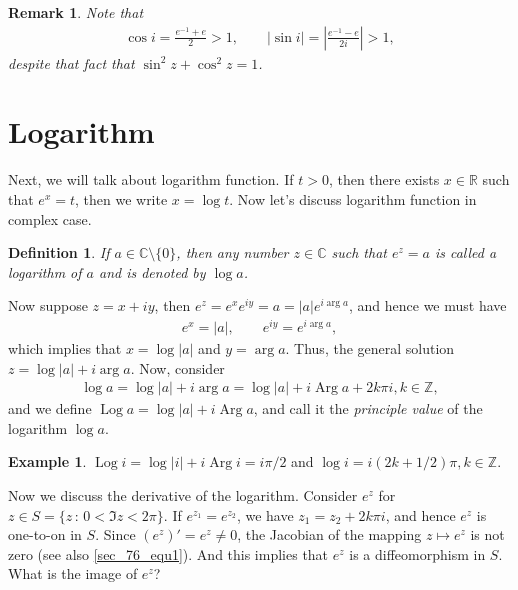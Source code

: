 \documentclass[11pt]{book}
\newtheorem{definition}{Definition}[chapter]
\newtheorem{remark}{Remark}[chapter]
\theoremstyle{definition}
\newtheorem{example}{Example}[chapter]
\numberwithin{equation}{chapter}
\begin{document}
\begin{remark}
Note that 
\begin{align*}
    \cos i = \frac{e^{-1} + e}{2} > 1, \qquad \left|\sin i\right| = \left|\frac{e^{-1} - e}{2i}\right| > 1,
\end{align*}
despite that fact that $\sin^2 z + \cos ^2 z = 1$.
\end{remark}

\medskip

\section{Logarithm}

Next, we will talk about logarithm function. If $t > 0$, then there exists $x \in \mathbb{R}$ such that $e^x = t$, then we write $x = \log t$. Now let's discuss logarithm function in complex case.

\medskip

\begin{definition}
If $a \in \mathbb{C}\setminus\{0\}$, then any number $z \in \mathbb{C}$ such that $e^z = a$ is called a logarithm of $a$ and is denoted by $\log a$.
\end{definition}

\medskip

Now suppose $z = x + iy$, then $e^z = e^x e^{iy} = a = \left|a\right| e^{i \arg a}$, and hence we must have
\begin{align*}
    e^x = \left|a\right|, \qquad e^{iy} = e^{i \arg a},
\end{align*}
which implies that $x = \log \left|a\right|$ and $y = \arg a$. Thus, the general solution $z = \log \left|a\right| + i \arg a$. Now, consider
\begin{align*}
    \log a = \log \left|a\right| + i \arg a = \log \left|a\right| + i \operatorname{Arg} a + 2k\pi i, k \in \mathbb{Z},
\end{align*}
and we define $\operatorname{Log} a = \log \left|a\right| + i \operatorname{Arg} a$, and call it the {\it principle value} of the logarithm $\log a$. 

\medskip

\begin{example}
$\operatorname{Log} i = \log \left|i\right| + i\operatorname{Arg} i = i\pi/2$ and $\log i = i(2k + 1/2)\pi, k \in \mathbb{Z}$.
\end{example}

\medskip

Now we discuss the derivative of the logarithm. Consider $e^z$ for $z \in S = \{z \,:\, 0 < \Im z < 2\pi\}$. If $e^{z_1} = e^{z_2}$, we have $z_1 = z_2 + 2k\pi i$, and hence $e^z$ is one-to-on in $S$. Since $\left(e^z\right)' = e^z \neq 0$, the Jacobian of the mapping $z \mapsto e^z$ is not zero (see also \eqref{sec_76_equ1}). And this implies that $e^z$ is a diffeomorphism in $S$. What is the image of $e^z$? 
\end{document}
